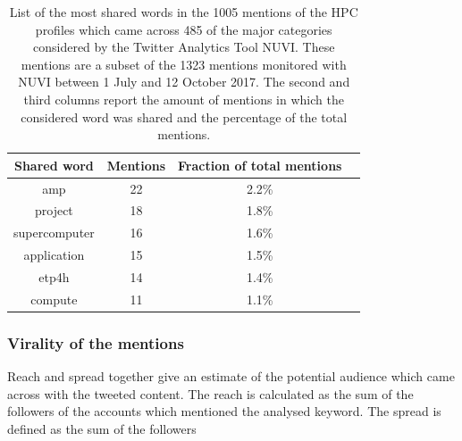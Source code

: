 \begin{table}[t]
 \begin{center}
 {\scriptsize
  \begin{tabular}{cccc}
   \hline 
   \hline
   Shared word & Mentions & Fraction of total mentions \\ 
   \hline
   \hline
   amp & 22 & 2.2\% \\
   project & 18 & 1.8\% \\
   supercomputer & 16 & 1.6\% \\
   application & 15 & 1.5\% \\
   etp4h & 14 & 1.4\% \\
   compute & 11 & 1.1\% \\
   \hline
   \hline
  \end{tabular}
 } 
 \end{center} 
 \caption{List of the most shared words in the 1005 mentions of the HPC profiles which came across 485 of the major categories considered by the Twitter Analytics Tool NUVI. These mentions are a subset of the 1323 mentions monitored with NUVI between 1 July and 12 October 2017. The second and third columns report the amount of mentions in which the considered word was shared and the percentage of the total mentions. }
\label{Most_shared_words} 
\end{table}

\subsubsection{Virality of the mentions}
Reach and spread together give an estimate of the potential audience which came across with the tweeted content. The reach is calculated as the sum of the followers of the accounts which mentioned the analysed keyword. The spread is defined as the sum of the followers

